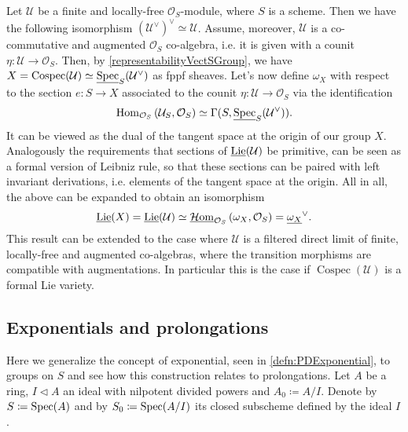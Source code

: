\begin{rem}\label{LieDualConormalSheaf}
	Let $\mathcal{U}$ be a finite and locally-free $\mathcal{O}_{ S }$-module,
	where $S$ is a scheme.
	Then we have the following isomorphism $(\mathcal{U}^\vee)^\vee \simeq \mathcal{U}$.
	Assume, moreover, \(\mathcal{U}\) is a co-commutative and
	augmented \(\mathcal{O}_{ S }\) co-algebra, i.e$.$
	it is given with a counit \(\eta\colon \mathcal{U} \to \mathcal{O}_{ S }\).
	Then, by \cref{representabilityVectSGroup},
	we have $X = \operatorname{Cospec}(\mathcal{U}) \simeq 
	\underline{\operatorname{Spec}}_S(\mathcal{U}^\vee)$ as fppf sheaves.
	Let's now define $\omega_X$ with respect to the section $e\colon S \to X$
	associated to the counit $\eta\colon \mathcal{U} \to \mathcal{O}_{ S }$
	via the identification
	\begin{equation*}
		\operatorname{Hom}_{ \mathcal{O}_{ S }}
		\left( \mathcal{U}_{S}, \mathcal{O}_{ S } \right) 
		\simeq
		\Gamma(S, \underline{\operatorname{Spec}}_S(\mathcal{U}^\vee))
	.\end{equation*}
	It can be viewed as the dual of the tangent space at the origin
	of our group $X$.
	Analogously the requirements that sections of $\underline{\operatorname{Lie}}(\mathcal{U})$
	be primitive, can be seen as a formal version of Leibniz rule,
	so that these sections can be paired with left invariant derivations, i.e$.$
	elements of the tangent space at the origin.
	All in all, the above can be expanded to obtain an isomorphism
	\begin{equation*}
		\underline{\operatorname{Lie}}(X) =
		\underline{\operatorname{Lie}}(\mathcal{U}) \simeq
		\underline{\mathcal{H}\mathrm{om}}_{ \mathcal{O}_{ S } } 
		\left(\omega_X , \mathcal{O}_{ S } \right) =
		\underline{\omega_X}^\vee
	.\end{equation*}
	This result can be extended to the case where \(\mathcal{U}\)
	is a filtered direct limit of finite, locally-free and augmented co-algebras,
	where the transition morphisms are compatible with augmentations.
	In particular this is the case if \(\operatorname{Cospec}(\mathcal{U})\)
	is a formal Lie variety.
\end{rem}


\subsection{Exponentials and prolongations}
Here we generalize the concept of exponential, seen in \cref{defn:PDExponential},
to groups on $S$ and see how this construction relates to prolongations.
Let $A$ be a ring, $I \triangleleft A$ an ideal with nilpotent
divided powers and $A_0 \coloneqq A/I$.
Denote by $S \coloneqq \operatorname{Spec}(A)$
and by $S_0 \coloneqq \operatorname{Spec}(A/I)$ its closed
subscheme defined by the ideal $I$.



